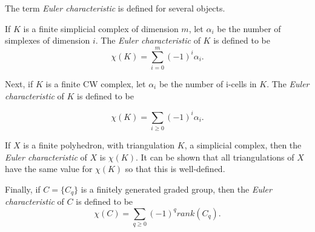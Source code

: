 \documentclass[12pt]{article}
\begin{document}
The term \emph{Euler characteristic} is defined for several objects.

If $K$ is a finite simplicial complex of dimension $m$, let $\alpha_i$ be the number of
simplexes of dimension $i$. The \emph{Euler characteristic} of $K$
is defined to be
$$
\chi(K) = \sum_{i=0}^m (-1)^i \alpha_i .
$$

Next, if $K$ is a finite CW complex, let $\alpha_i$ be the number of i-cells
in $K$. The \emph{Euler characteristic} of $K$
is defined to be

$$
\chi(K) = \sum_{i \ge 0}(-1)^i \alpha_i .
$$

If $X$ is a finite polyhedron, with triangulation $K$, a simplicial complex,
then the \emph{Euler characteristic} of $X$ is $\chi(K)$. It can be shown
that all triangulations of $X$ have the same value for $\chi(K)$ so that
this is well-defined. 

Finally, if $C=\{C_q\}$ is a finitely generated graded group, then
the \emph{Euler characteristic} of $C$ is defined to be
$$
\chi(C) = \sum_{q \ge 0}  (-1)^q rank(C_q) .
$$
\end{document}
